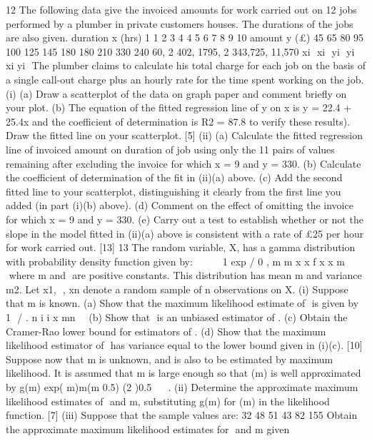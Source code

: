 
12 The following data give the invoiced amounts for work carried out on 12 jobs
performed by a plumber in private customers houses. The durations of the jobs are
also given.
duration x (hrs) 1 1 2 3 4 4 5 6 7 8 9 10
amount y (£) 45 65 80 95 100 125 145 180 180 210 330 240
60, 2 402, 1795, 2 343,725, 11,570 xi  xi  yi  yi  xi yi 
The plumber claims to calculate his total charge for each job on the basis of a single
call-out charge plus an hourly rate for the time spent working on the job.
(i) (a) Draw a scatterplot of the data on graph paper and comment briefly on
your plot.
(b) The equation of the fitted regression line of y on x is y = 22.4 + 25.4x
and the coefficient of determination is R2 = 87.8%
to verify these results).
Draw the fitted line on your scatterplot. [5]
(ii) (a) Calculate the fitted regression line of invoiced amount on duration of
job using only the 11 pairs of values remaining after excluding the
invoice for which x = 9 and y = 330.
(b) Calculate the coefficient of determination of the fit in (ii)(a) above.
(c) Add the second fitted line to your scatterplot, distinguishing it clearly
from the first line you added (in part (i)(b) above).
(d) Comment on the effect of omitting the invoice for which x = 9 and
y = 330.
(e) Carry out a test to establish whether or not the slope in the model fitted
in (ii)(a) above is consistent with a rate of £25 per hour for work
carried out. [13]
13 The random variable, X, has a gamma distribution with probability density function
given by:
 
 
 
 
1 exp /
0 ,
m
m
x x
f x x
m
  
 
 
where m and  are positive constants. This distribution has mean m and variance
m2. Let x1,  , xn denote a random sample of n observations on X.
(i) Suppose that m is known.
(a) Show that the maximum likelihood estimate of  is given by
1
 / . n
i i x mn

 
(b) Show that 
is an unbiased estimator of .
(c) Obtain the Cramer-Rao lower bound for estimators of .
(d) Show that the maximum likelihood estimator of  has variance equal
to the lower bound given in (i)(c). [10]
Suppose now that m is unknown, and is also to be estimated by maximum likelihood.
It is assumed that m is large enough so that (m) is well approximated by
g(m) exp( m)m(m 0.5) (2 )0.5 
   .
(ii) Determine the approximate maximum likelihood estimates of  and m,
substituting g(m) for (m) in the likelihood function. [7]
(iii) Suppose that the sample values are:
32 48 51 43 82 155
Obtain the approximate maximum likelihood estimates for  and m given
